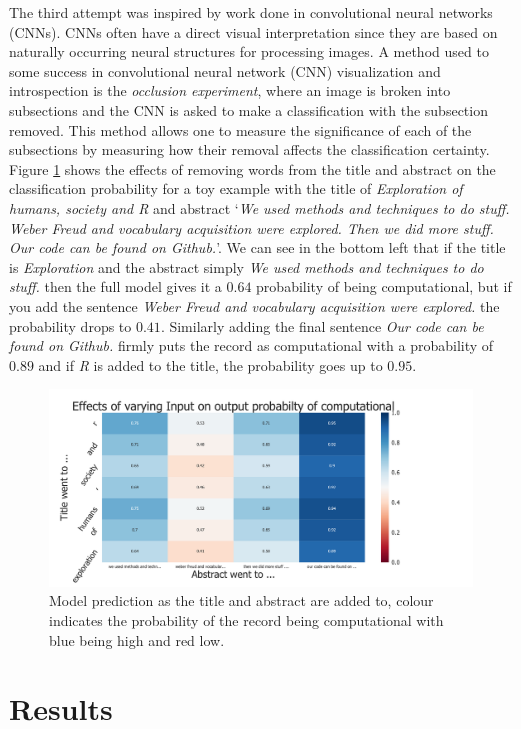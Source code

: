 \documentclass[12pt, a4paper]{article}
\begin{document}
The third attempt was inspired by work done in convolutional neural networks (CNNs). CNNs often have a direct visual interpretation since they are based on naturally occurring neural structures for processing images. A method used to some success in convolutional neural network (CNN) visualization and introspection is the \textit{occlusion experiment}, where an image is broken into subsections and the CNN is asked to make a classification with the subsection removed. This method allows one to measure the significance of each of the subsections by measuring how their removal affects the classification certainty. Figure \ref{oc1} shows the effects of removing words from the title and abstract on the classification probability for a toy example with the title of \textit{Exploration of humans, society and R} and abstract `\textit{We used methods and techniques to do stuff. Weber Freud and vocabulary acquisition were explored. Then we did more stuff. Our code can be found on Github.}'. We can see in the bottom left that if the title is \textit{Exploration} and the abstract simply \textit{We used methods and techniques to do stuff.} then the full model gives it a $0.64$ probability of being computational, but if you add the sentence \textit{Weber Freud and vocabulary acquisition were explored.} the probability drops to $0.41$. Similarly adding the final sentence \textit{Our code can be found on Github.} firmly puts the record as computational with a probability of $0.89$ and if \textit{R} is added to the title, the probability goes up to $0.95$.
	
\begin{figure}[ht]
	\centering
	\includegraphics[width=1\textwidth]{occ_example}
	\caption{Model prediction as the title and abstract are added to, colour indicates the probability of the record being computational with blue being high and red low.}\label{oc1}
\end{figure}

\section*{Results}
\end{document}
